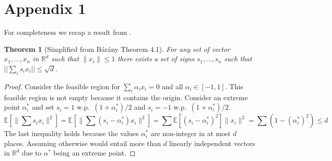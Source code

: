 \documentclass{article} %
\newtheorem{theorem}{Theorem}[section]
\newcommand{\R}{\mathbb{R}}
\newcommand{\E}{\mathbb{E}}
\newcommand{\eps}{\epsilon}
\begin{document}
%
%
%
%



\section{Appendix 1}
For completeness we recap a result from \cite{barany2008}.
\begin{theorem}[Simplified from B\'ar\'any \cite{barany2008} Theorem 4.1]
For any set of vector $x_1,...,x_n$ in $\R^d$ such that $\|x_i\| \le 1$ there exists a set of signs $s_1,...,s_n$ such that $||\sum_i s_i x_i || \le \sqrt{d}$.
\end{theorem}
\begin{proof}
Consider the feasible region for $\sum_i \alpha_i x_i = 0$ and all $\alpha_i \in [-1,1]$.
This feasible region is not empty because it contains the origin. 
Consider an extreme point $\alpha^*_i$ and set $s_i = 1$ w.p.\ $(1+\alpha^*_i)/2$ and $s_i = -1$ w.p.\ $(1+\alpha^*_i)/2$.
$$
\E[\|\sum s_i x_i\|^2] =  \E[\|\sum (s_i - \alpha^*_i) x_i\|^2] = \sum \E[(s_i - \alpha^*_i)^2] \|x_i\|^2= \sum (1-(\alpha_i^*)^2) \le d
$$
The last inequality holds because the values $\alpha^*_i$ are non-integer in at most $d$ places. 
Assuming otherwise would entail more than $d$ linearly independent vectors in $\R^d$ due to $\alpha^*$ being an extreme point.
\end{proof}
\end{document}
